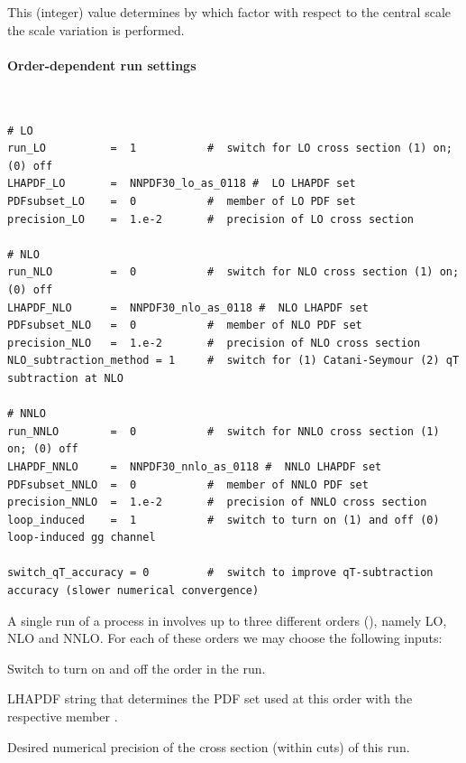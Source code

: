 \documentclass[english,11pt]{article}
\begin{document}
\quad This (integer) value determines by which factor 
with respect to the central scale the scale variation is performed.

\paragraph{Order-dependent run settings}\label{sec:paramOrder}
\lstset{basicstyle=\scriptsize, frame=single}
{\tt
\begin{lstlisting}
# LO
run_LO          =  1           #  switch for LO cross section (1) on; (0) off 
LHAPDF_LO       =  NNPDF30_lo_as_0118 #  LO LHAPDF set
PDFsubset_LO    =  0           #  member of LO PDF set
precision_LO    =  1.e-2       #  precision of LO cross section

# NLO
run_NLO         =  0           #  switch for NLO cross section (1) on; (0) off 
LHAPDF_NLO      =  NNPDF30_nlo_as_0118 #  NLO LHAPDF set
PDFsubset_NLO   =  0           #  member of NLO PDF set
precision_NLO   =  1.e-2       #  precision of NLO cross section
NLO_subtraction_method = 1     #  switch for (1) Catani-Seymour (2) qT subtraction at NLO

# NNLO
run_NNLO        =  0           #  switch for NNLO cross section (1) on; (0) off 
LHAPDF_NNLO     =  NNPDF30_nnlo_as_0118 #  NNLO LHAPDF set
PDFsubset_NNLO  =  0           #  member of NNLO PDF set
precision_NNLO  =  1.e-2       #  precision of NNLO cross section
loop_induced    =  1           #  switch to turn on (1) and off (0) loop-induced gg channel

switch_qT_accuracy = 0         #  switch to improve qT-subtraction accuracy (slower numerical convergence) 

\end{lstlisting}
}

A single run of a process in \Matrix{} involves up to three different orders (), namely LO, NLO and NNLO. 
For each of these orders we may choose the following inputs:

\quad Switch to turn on and off the order  in the run.

\quad LHAPDF string that determines the PDF set used at this order with the respective member . 

\quad Desired numerical precision of the cross section (within cuts) of this run.
\end{document}
